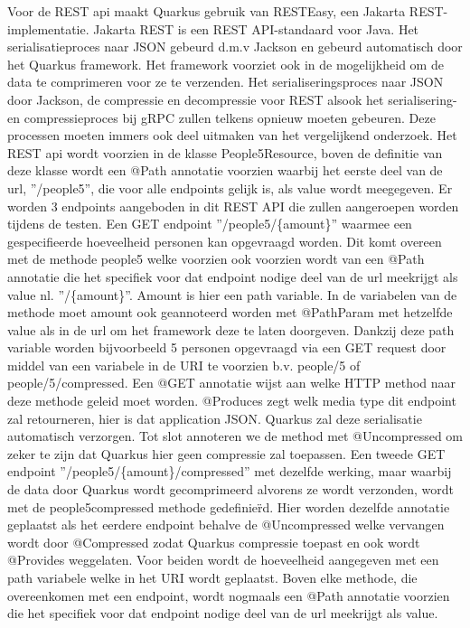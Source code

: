 Voor de REST api maakt Quarkus gebruik van RESTEasy, een Jakarta REST-implementatie. Jakarta REST is een REST API-standaard voor Java.
Het serialisatieproces naar JSON gebeurd d.m.v Jackson en gebeurd automatisch door het Quarkus framework.
Het framework voorziet ook in de mogelijkheid om de data te comprimeren voor ze te verzenden.
Het serialiseringsproces naar JSON door Jackson, de compressie en decompressie voor REST alsook het serialisering- en compressieproces bij gRPC zullen telkens opnieuw moeten gebeuren.
Deze processen moeten immers ook deel uitmaken van het vergelijkend onderzoek.
Het REST api wordt voorzien in de klasse People5Resource, boven de definitie van deze klasse wordt een @Path annotatie voorzien waarbij
het eerste deel van de url, ''/people5'', die voor alle endpoints gelijk is, als value wordt meegegeven.
Er worden 3 endpoints aangeboden in dit REST API die zullen aangeroepen worden tijdens de testen. Een GET endpoint ''/people5/\{amount\}'' waarmee een gespecifieerde hoeveelheid
personen kan opgevraagd worden. Dit komt overeen met de methode people5 welke voorzien ook voorzien wordt van een @Path annotatie
die het specifiek voor dat endpoint nodige deel van de url meekrijgt als value nl. ''/\{amount\}''. Amount is hier een path variable. In de variabelen van
de methode moet amount ook geannoteerd worden met @PathParam met hetzelfde value als in de url om het framework deze te laten doorgeven.
Dankzij deze path variable worden bijvoorbeeld 5 personen opgevraagd via een GET request door middel van een variabele in de URI te voorzien b.v.
people/5 of people/5/compressed.
Een @GET annotatie wijst aan welke HTTP method naar deze methode geleid moet worden. @Produces zegt welk media type dit endpoint zal retourneren, hier is dat application JSON.
Quarkus zal deze serialisatie automatisch verzorgen. Tot slot annoteren we de method met @Uncompressed om zeker te zijn dat Quarkus hier geen compressie zal toepassen.
Een tweede GET endpoint ''/people5/\{amount\}/compressed'' met dezelfde werking, maar waarbij de data door Quarkus wordt gecomprimeerd alvorens ze wordt verzonden,
wordt met de people5compressed methode gedefinie\"rd. Hier worden dezelfde annotatie geplaatst als het eerdere endpoint behalve de @Uncompressed welke vervangen
wordt door @Compressed zodat Quarkus compressie toepast en ook wordt @Provides weggelaten.
Voor beiden wordt de hoeveelheid aangegeven met een path variabele welke in het URI wordt geplaatst. Boven elke methode, die overeenkomen met een endpoint,
wordt nogmaals een @Path annotatie voorzien die het specifiek voor dat endpoint nodige deel van de url meekrijgt als value.
